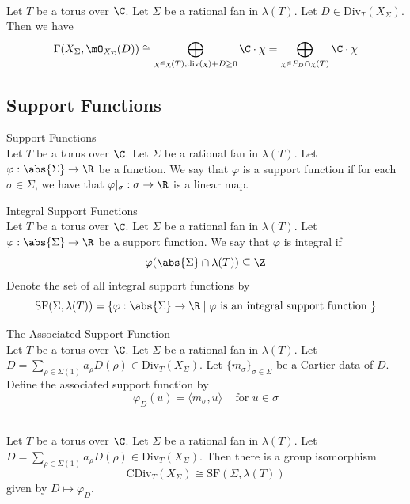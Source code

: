 \documentclass[a4paper]{article}
\begin{document}
\begin{prp}{}{}\\
Let $T$ be a torus over $\C$. Let $\Sigma$ be a rational fan in $\lambda(T)$. Let $D\in\text{Div}_T(X_\Sigma)$. Then we have $$\Gamma(X_\Sigma,\mO_{X_\Sigma}(D))\cong\bigoplus_{\chi\in\chi(T),\text{div}(\chi)+D\geq 0}\C\cdot\chi=\bigoplus_{\chi\in P_D\cap\chi(T)}\C\cdot\chi$$
\end{prp}

\subsection{Support Functions}
\begin{defn}{Support Functions}{}\\
Let $T$ be a torus over $\C$. Let $\Sigma$ be a rational fan in $\lambda(T)$. Let $\varphi:\abs{\Sigma}\to\R$ be a function. We say that $\varphi$ is a support function if for each $\sigma\in\Sigma$, we have that $\varphi|_\sigma:\sigma\to\R$ is a linear map. 
\end{defn}

\begin{defn}{Integral Support Functions}{}\\
Let $T$ be a torus over $\C$. Let $\Sigma$ be a rational fan in $\lambda(T)$. Let $\varphi:\abs{\Sigma}\to\R$ be a support function. We say that $\varphi$ is integral if $$\varphi(\abs{\Sigma}\cap\lambda(T))\subseteq\Z$$ Denote the set of all integral support functions by $$\text{SF}(\Sigma,\lambda(T))=\{\varphi:\abs{\Sigma}\to\R\;|\;\varphi\text{ is an integral support function }\}$$
\end{defn}

\begin{defn}{The Associated Support Function}{}\\
Let $T$ be a torus over $\C$. Let $\Sigma$ be a rational fan in $\lambda(T)$. Let $D=\sum_{\rho\in\Sigma(1)}a_\rho D(\rho)\in\text{Div}_T(X_\Sigma)$. Let $\{m_\sigma\}_{\sigma\in\Sigma}$ be a Cartier data of $D$. Define the associated support function by $$\varphi_D(u)=\langle m_\sigma,u\rangle\;\;\;\text{ for }u\in\sigma$$
\end{defn}

\begin{prp}{}{}\\
Let $T$ be a torus over $\C$. Let $\Sigma$ be a rational fan in $\lambda(T)$. Let $D=\sum_{\rho\in\Sigma(1)}a_\rho D(\rho)\in\text{Div}_T(X_\Sigma)$. Then there is a group isomorphism $$\text{CDiv}_T(X_\Sigma)\cong\text{SF}(\Sigma,\lambda(T))$$ given by $D\mapsto\varphi_D$. 
\end{prp}
\end{document}

